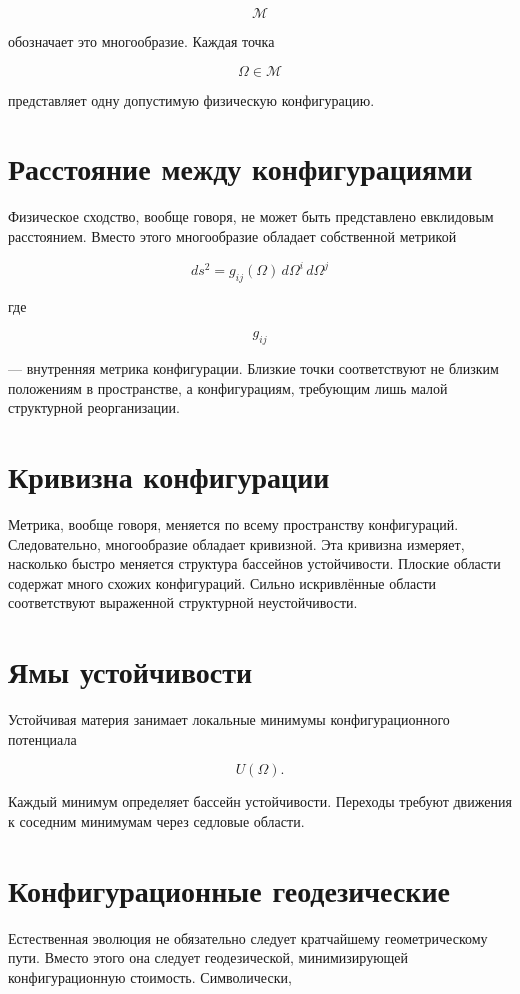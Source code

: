 \[ \mathcal M \]

обозначает это многообразие. Каждая точка

\[ \Omega\in\mathcal M \]

представляет одну допустимую физическую конфигурацию.

\section{Расстояние между конфигурациями}

Физическое сходство, вообще говоря, не может быть представлено евклидовым расстоянием. Вместо этого многообразие обладает собственной метрикой

\[ \boxed{ ds^2 = g_{ij}(\Omega) \,d\Omega^i \,d\Omega^j } \]

где

\[ g_{ij} \]

— внутренняя метрика конфигурации. Близкие точки соответствуют не близким положениям в пространстве, а конфигурациям, требующим лишь малой структурной реорганизации.

\section{Кривизна конфигурации}

Метрика, вообще говоря, меняется по всему пространству конфигураций. Следовательно, многообразие обладает кривизной. Эта кривизна измеряет, насколько быстро меняется структура бассейнов устойчивости. Плоские области содержат много схожих конфигураций. Сильно искривлённые области соответствуют выраженной структурной неустойчивости.

\section{Ямы устойчивости}

Устойчивая материя занимает локальные минимумы конфигурационного потенциала

\[ U(\Omega). \]

Каждый минимум определяет бассейн устойчивости. Переходы требуют движения к соседним минимумам через седловые области.

\section{Конфигурационные геодезические}

Естественная эволюция не обязательно следует кратчайшему геометрическому пути. Вместо этого она следует геодезической, минимизирующей конфигурационную стоимость. Символически,

